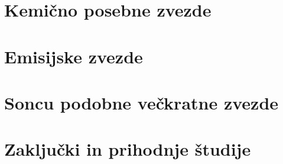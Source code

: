 \section{Kemično posebne zvezde}
\label{sec:slo_c_peculiars}


\section{Emisijske zvezde}
\label{sec:slo_emisijske}


\section{Soncu podobne večkratne zvezde}
\label{sec:slo_soncevi_veckratniki}


\section{Zaključki in prihodnje študije}
\label{sec:slo_zakljucek}
